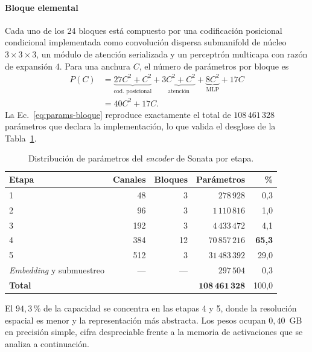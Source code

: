 \paragraph*{Bloque elemental}
Cada uno de los 24 bloques está compuesto por una codificación posicional
condicional implementada como convolución dispersa submanifold de núcleo
$3\times3\times3$, un módulo de atención serializada y un perceptrón multicapa
con razón de expansión 4. Para una anchura $C$, el número de parámetros por
bloque es
\begin{equation}
\begin{aligned}
P(C)&=\underbrace{27C^{2}+C^{2}}_{\text{cod. posicional}}
     +\underbrace{3C^{2}+C^{2}}_{\text{atención}}
     +\underbrace{8C^{2}}_{\text{MLP}}+17C\\[2pt]
    &=40C^{2}+17C .
\end{aligned}
\label{eq:params-bloque}
\end{equation}
La Ec.~\eqref{eq:params-bloque} reproduce exactamente el total de
$108\,461\,328$ parámetros que declara la implementación, lo que valida el
desglose de la Tabla~\ref{tab:params-sonata}.

\begin{table}[H]
\centering
\caption{Distribución de parámetros del \emph{encoder} de Sonata por etapa.}
\label{tab:params-sonata}
\begin{tabular}{@{}lrrrr@{}}
\toprule
\textbf{Etapa} & \textbf{Canales} & \textbf{Bloques} & \textbf{Parámetros} & \textbf{\%} \\
\midrule
1 & 48 & 3 & $278\,928$ & 0{,}3 \\
2 & 96 & 3 & $1\,110\,816$ & 1{,}0 \\
3 & 192 & 3 & $4\,433\,472$ & 4{,}1 \\
4 & 384 & 12 & $70\,857\,216$ & \textbf{65{,}3} \\
5 & 512 & 3 & $31\,483\,392$ & 29{,}0 \\
\emph{Embedding} y submuestreo & --- & --- & $297\,504$ & 0{,}3 \\
\midrule
\textbf{Total} & & & $\mathbf{108\,461\,328}$ & 100{,}0 \\
\bottomrule
\end{tabular}
\end{table}

El $94{,}3$\,\% de la capacidad se concentra en las etapas 4 y 5, donde la
resolución espacial es menor y la representación más abstracta. Los pesos ocupan
$0{,}40$~GB en precisión simple, cifra despreciable frente a la memoria de
activaciones que se analiza a continuación.

